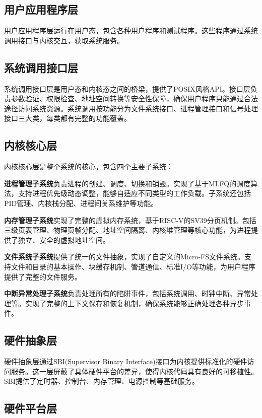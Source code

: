 \subsection{用户应用程序层}

用户应用程序层运行在用户态，包含各种用户程序和测试程序。这些程序通过系统调用接口与内核交互，获取系统服务。

\subsection{系统调用接口层}

系统调用接口层是用户态和内核态之间的桥梁，提供了POSIX风格API。接口层负责参数验证、权限检查、地址空间转换等安全性保障，确保用户程序只能通过合法途径访问系统资源。系统调用按功能分为文件系统接口、进程管理接口和信号处理接口三大类，每类都有完整的功能覆盖。

\subsection{内核核心层}

内核核心层是整个系统的核心，包含四个主要子系统：

\textbf{进程管理子系统}负责进程的创建、调度、切换和销毁。实现了基于MLFQ的调度算法，支持进程优先级动态调整，能够自适应不同类型的工作负载。子系统还包括PID管理、内核栈分配、进程间关系维护等功能。

\textbf{内存管理子系统}实现了完整的虚拟内存系统，基于RISC-V的SV39分页机制。包括三级页表管理、物理页帧分配、地址空间隔离、内核堆管理等核心功能，为进程提供了独立、安全的虚拟地址空间。

\textbf{文件系统子系统}提供了统一的文件抽象，实现了自定义的Micro-FS文件系统。支持文件和目录的基本操作、块缓存机制、管道通信、标准I/O等功能，为用户程序提供了完整的文件服务。

\textbf{中断异常处理子系统}负责处理所有的陷阱事件，包括系统调用、时钟中断、异常处理等。实现了完整的上下文保存和恢复机制，确保系统能够正确处理各种异步事件。

\subsection{硬件抽象层}

硬件抽象层通过SBI(Supervisor Binary Interface)接口为内核提供标准化的硬件访问服务。这一层屏蔽了具体硬件平台的差异，使得内核代码具有良好的可移植性。SBI提供了定时器、控制台、内存管理、电源控制等基础服务。

\subsection{硬件平台层}

